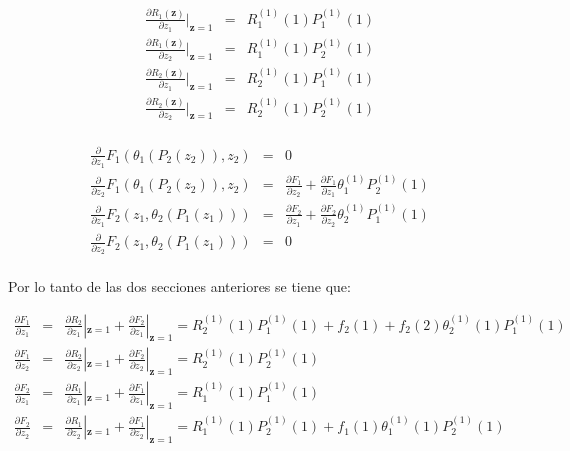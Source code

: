 \begin{eqnarray*}
\frac{\partial R_{1}\left(\mathbf{z}\right)}{\partial
z_{1}}|_{\mathbf{z}=1}&=&R_{1}^{(1)}\left(1\right)P_{1}^{(1)}\left(1\right)\\
\frac{\partial R_{1}\left(\mathbf{z}\right)}{\partial
z_{2}}|_{\mathbf{z}=1}&=&R_{1}^{(1)}\left(1\right)P_{2}^{(1)}\left(1\right)\\
\frac{\partial R_{2}\left(\mathbf{z}\right)}{\partial
z_{1}}|_{\mathbf{z}=1}&=&R_{2}^{(1)}\left(1\right)P_{1}^{(1)}\left(1\right)\\
\frac{\partial R_{2}\left(\mathbf{z}\right)}{\partial
z_{2}}|_{\mathbf{z}=1}&=&R_{2}^{(1)}\left(1\right)P_{2}^{(1)}\left(1\right)\\
\end{eqnarray*}



\begin{eqnarray*}
\frac{\partial}{\partial
z_{1}}F_{1}\left(\theta_{1}\left(P_{2}\left(z_{2}\right)\right),z_{2}\right)&=&0\\
\frac{\partial}{\partial
z_{2}}F_{1}\left(\theta_{1}\left(P_{2}\left(z_{2}\right)\right),z_{2}\right)&=&\frac{\partial
F_{1}}{\partial z_{2}}+\frac{\partial F_{1}}{\partial
z_{1}}\theta_{1}^{(1)}P_{2}^{(1)}\left(1\right)\\
\frac{\partial}{\partial
z_{1}}F_{2}\left(z_{1},\theta_{2}\left(P_{1}\left(z_{1}\right)\right)\right)&=&\frac{\partial
F_{2}}{\partial z_{1}}+\frac{\partial F_{2}}{\partial
z_{2}}\theta_{2}^{(1)}P_{1}^{(1)}\left(1\right)\\
\frac{\partial}{\partial
z_{2}}F_{2}\left(z_{1},\theta_{2}\left(P_{1}\left(z_{1}\right)\right)\right)&=&0\\
\end{eqnarray*}


Por lo tanto de las dos secciones anteriores se tiene que:


\begin{eqnarray*}
\frac{\partial F_{1}}{\partial z_{1}}&=&\frac{\partial
R_{2}}{\partial z_{1}}|_{\mathbf{z}=1}+\frac{\partial F_{2}}{\partial z_{1}}|_{\mathbf{z}=1}=R_{2}^{(1)}\left(1\right)P_{1}^{(1)}\left(1\right)+f_{2}\left(1\right)+f_{2}\left(2\right)\theta_{2}^{(1)}\left(1\right)P_{1}^{(1)}\left(1\right)\\
\frac{\partial F_{1}}{\partial z_{2}}&=&\frac{\partial
R_{2}}{\partial z_{2}}|_{\mathbf{z}=1}+\frac{\partial F_{2}}{\partial z_{2}}|_{\mathbf{z}=1}=R_{2}^{(1)}\left(1\right)P_{2}^{(1)}\left(1\right)\\
\frac{\partial F_{2}}{\partial z_{1}}&=&\frac{\partial
R_{1}}{\partial z_{1}}|_{\mathbf{z}=1}+\frac{\partial F_{1}}{\partial z_{1}}|_{\mathbf{z}=1}=R_{1}^{(1)}\left(1\right)P_{1}^{(1)}\left(1\right)\\
\frac{\partial F_{2}}{\partial z_{2}}&=&\frac{\partial
R_{1}}{\partial z_{2}}|_{\mathbf{z}=1}+\frac{\partial F_{1}}{\partial z_{2}}|_{\mathbf{z}=1}
=R_{1}^{(1)}\left(1\right)P_{2}^{(1)}\left(1\right)+f_{1}\left(1\right)\theta_{1}^{(1)}\left(1\right)P_{2}^{(1)}\left(1\right)\\
\end{eqnarray*}


